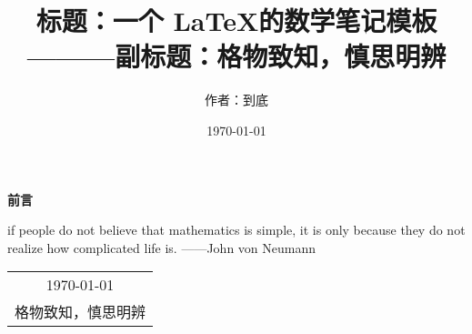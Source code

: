 \title{{\Huge{\textbf{标题：一个 \LaTeX 的数学笔记模板}}} \\ ———副标题：格物致知，慎思明辨}
\author{作者：到底}
\date{\today}
\maketitle                   %

\thispagestyle{empty}        %
\begin{center}
\Huge\textbf{前言}
\end{center}

if people do not believe that mathematics is simple, 
it is only because they do not realize how complicated life is. ——John von Neumann

\begin{flushright}
\begin{tabular}{c}
\today \\ 格物致知，慎思明辨
\end{tabular}
\end{flushright}

\newpage                      %
\pagestyle{plain}             %
\setcounter{page}{1}          %
\tableofcontents              %

\newpage                      %
\pagestyle{plain}
\setcounter{page}{1}          %

